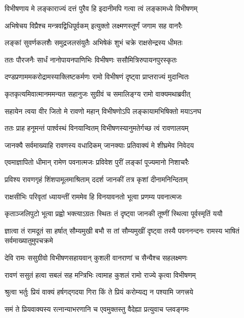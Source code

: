 \twolineshloka
{विभीषणाय मे लङ्काराज्यं दत्तं पुरैव हि}
{इदानीमपि गत्वा त्वं लङ्कामध्ये विभीषणम्} %

\twolineshloka
{अभिषेचय विप्रैश्च मन्त्रवद्विधिपूर्वकम्}
{इत्युक्तो लक्ष्मणस्तूर्णं जगाम सह वानरैः} %

\twolineshloka
{लङ्कां सुवर्णकलशैः समुद्रजलसंयुतैः}
{अभिषेकं शुभं चक्रे राक्षसेन्द्रस्य धीमतः} %

\twolineshloka
{ततः पौरजनैः सार्धं नानोपायनपाणिभिः}
{विभीषणः ससौमित्रिरुपायनपुरस्कृतः} %

\twolineshloka
{दण्डप्रणाममकरोद्रामस्याक्लिष्टकर्मणः}
{रामो विभीषणं दृष्ट्वा प्राप्तराज्यं मुदान्वितः} %

\twolineshloka
{कृतकृत्यमिवात्मानममन्यत सहानुजः}
{सुग्रीवं च समालिङ्ग्य रामो वाक्यमथाब्रवीत्} %

\twolineshloka
{सहायेन त्वया वीर जितो मे रावणो महान्}
{विभीषणोऽपि लङ्कायामभिषिक्तो मयाऽनघ} %

\twolineshloka
{ततः प्राह हनूमन्तं पार्श्वस्थं विनयान्वितम्}
{विभीषणस्यानुमतेर्गच्छ त्वं रावणालयम्} %

\twolineshloka
{जानक्यै सर्वमाख्याहि रावणस्य वधादिकम्}
{जानक्याः प्रतिवाक्यं मे शीघ्रमेव निवेदय} %

\twolineshloka
{एवमाज्ञापितो धीमान् रामेण पवनात्मजः}
{प्रविवेश पुरीं लङ्कां पूज्यमानो निशाचरैः} %

\twolineshloka
{प्रविश्य रावणगृहं शिंशपामूलमाश्रिताम्}
{ददर्श जानकीं तत्र कृशां दीनामनिन्दिताम्} %

\twolineshloka
{राक्षसीभिः परिवृतां ध्यायन्तीं राममेव हि}
{विनयावनतो भूत्वा प्रणम्य पवनात्मजः} %

\twolineshloka
{कृताञ्जलिपुटो भूत्वा प्रह्वो भक्त्याऽग्रतः स्थितः}
{तं दृष्ट्वा जानकी तूष्णीं स्थित्वा पूर्वस्मृतिं ययौ} %

\threelineshloka
{ज्ञात्वा तं रामदूतं सा हर्षात् सौम्यमुखी बभौ}
{स तां सौम्यमुखीं दृष्ट्वा तस्यै पवननन्दनः}
{रामस्य भाषितं सर्वमाख्यातुमुपचक्रमे} %

\twolineshloka
{देवि रामः ससुग्रीवो विभीषणसहायवान्}
{कुशली वानराणां च सैन्यैश्च सहलक्ष्मणः} %

\twolineshloka
{रावणं ससुतं हत्वा सबलं सह मन्त्रिभिः}
{त्वामाह कुशलं रामो राज्ये कृत्वा विभीषणम्} %

\twolineshloka
{श्रुत्वा भर्तुः प्रियं वाक्यं हर्षगद्गदया गिरा}
{किं ते प्रियं करोम्यद्य न पश्यामि जगत्त्रये} %

\twolineshloka
{समं ते प्रियवाक्यस्य रत्नान्याभरणानि च}
{एवमुक्तस्तु वैदेह्या प्रत्युवाच प्लवङ्गमः} %

